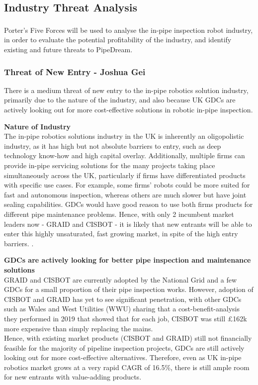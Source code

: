 \documentclass[11pt]{article}		%
\newcommand{\supercite}[1]{\textsuperscript{\cite{#1}}}		%
\begin{document}
		\subsection{Industry Threat Analysis}\label{industryP5F}
			
			Porter's Five Forces \supercite{porter2008five} will be used to analyse the in-pipe inspection robot industry, in order to evaluate the potential profitability of the industry, and identify existing and future threats to PipeDream.

			\subsubsection{Threat of New Entry - Joshua Gei} 
			
			There is a medium threat of new entry to the in-pipe robotics solution industry, primarily due to the nature of the industry, and also because UK GDCs are actively looking out for more cost-effective solutions in robotic in-pipe inspection. 
            
           \textbf{Nature of Industry} 
            \\
            The in-pipe robotics solutions industry in the UK is inherently an oligopolistic industry, as it has high but not absolute barriers to entry, such as deep technology know-how and high capital overlay. Additionally, multiple firms can provide in-pipe servicing solutions for the many projects taking place simultaneously across the UK, particularly if firms have differentiated products with specific use cases. For example, some firms’ robots could be more suited for fast and autonomous inspection, whereas others are much slower but have joint sealing capabilities. GDCs would have good reason to use both firms products for different pipe maintenance problems. Hence, with only 2 incumbent market leaders now - GRAID and CISBOT - it is likely that new entrants will be able to enter this highly unsaturated, fast growing market, in spite of the high entry barriers. .
         
            \textbf{GDCs are actively looking for better pipe inspection and maintenance solutions}
            \\
            GRAID and CISBOT are currently adopted by the National Grid and a few GDCs for a small proportion of their pipe inspection works. However, adoption of CISBOT and GRAID has yet to see significant penetration, with other GDCs such as Wales and West Utilities (WWU) sharing that a cost-benefit-analysis they performed in 2019 that showed that for each job, CISBOT was still £162k more expensive than simply replacing the mains.
            \\
            \hspace*{3ex}Hence, with existing market products (CISBOT and GRAID) still not financially feasible for the majority of pipeline inspection projects, GDCs are still actively looking out for more cost-effective alternatives. Therefore, even as UK in-pipe robotics market grows at a very rapid CAGR of 16.5\%, there is still ample room for new entrants with value-adding products. 
            
\end{document}
